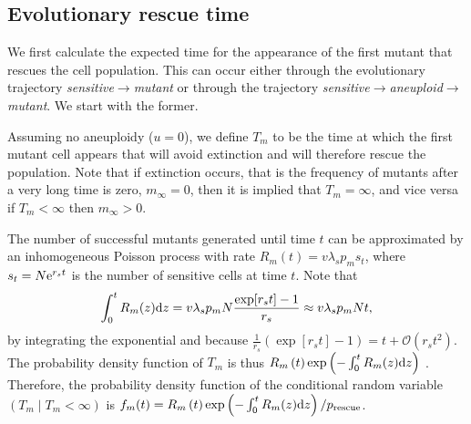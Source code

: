 \documentclass[12pt]{extarticle}
\renewcommand{\d}[1]{\ensuremath{\operatorname{d}\!{#1}}}
\renewcommand{\d}{{\rm d}}
\newcommand{\e}{{\rm e}}
\newcommand{\presc}{p_\text{rescue}}
\newcommand{\bigo}[1]{\mathcal{O}\left(#1\right)}
\renewcommand{\Delta}{r}
\begin{document}
\begin{appendices}
\section{Evolutionary rescue time}\label{sec:appendix_rescue_time}

We first calculate the expected time for the appearance of the first mutant that rescues the cell population.
This can occur either through the evolutionary trajectory \textit{sensitive}$\rightarrow$\textit{mutant} or through the trajectory \textit{sensitive}$\rightarrow$\textit{aneuploid}$\rightarrow$\textit{mutant}.
We start with the former. 

Assuming no aneuploidy ($u=0$), we define $T_m$ to be the time at which the first mutant cell appears that will avoid extinction and will therefore rescue the population.
Note that if extinction occurs, that is the frequency of mutants after a very long time is zero, $m_{\infty}=0$, then it is implied that $T_m=\infty$, and vice versa if $T_m<\infty$ then $m_{\infty}>0$.

The number of successful mutants generated until time $t$ can be approximated by an inhomogeneous Poisson process with rate $R_m\left(t\right) = v\lambda_s p_m s_t$, %
where $s_t=N\e^{\Delta_s t}$ is the number of sensitive cells at time $t$.
Note that 
\begin{equation}\label{eq:integralR}
\int_0^{t}{R_m(z)\d z} = 
v\lambda_s p_m N \frac{\exp[{\Delta_s t}]-1}{\Delta_s} \approx 
v\lambda_s p_m N t,
\end{equation}
by integrating the exponential and because $\frac{1}{\Delta_s} \left(\exp[\Delta_s t]-1\right) = t+ \bigo{\Delta_s t^2}$. %
The probability density function of $T_m$ is thus
$R_m\left(t\right)\exp\left(-\int_0^{t}{R_m(z)\d z}\right)$ \citep{allen2010introduction}. 
Therefore, the probability density function of the conditional random variable $(T_m \mid T_m < \infty)$ is
$f_m(t) = R_m \left(t\right)\exp\left(-\int_0^{t}{R_m(z)\d z}\right) / \presc$. 
\\


\end{appendices}
\end{document}
